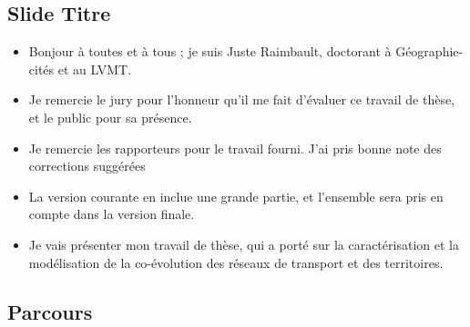 \documentclass[12pt]{article}
\begin{document}
\subsection*{Slide Titre}

\begin{itemize}
	\item Bonjour à toutes et à tous ; je suis Juste Raimbault, doctorant à Géographie-cités et au LVMT.
	\item Je remercie le jury pour l'honneur qu'il me fait d'évaluer ce travail de thèse, et le public pour sa présence.
	\item Je remercie les rapporteurs pour le travail fourni. J'ai pris bonne note des corrections suggérées
	\item La version courante en inclue une grande partie, et l'ensemble sera pris en compte dans la version finale.
	\item Je vais présenter mon travail de thèse, qui a porté sur la caractérisation et la modélisation de la co-évolution des réseaux de transport et des territoires.
\end{itemize}


\newpage


\subsection*{Parcours}
\end{document}
